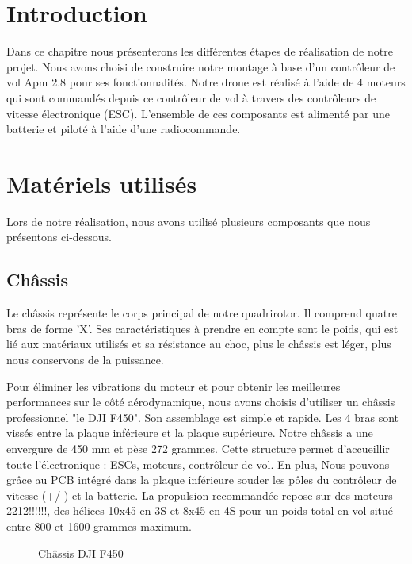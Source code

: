 \documentclass[a4paper,12pt]{book}
\begin{document}
	\section{Introduction}
	
	Dans ce chapitre nous présenterons les différentes étapes de réalisation de notre projet. Nous avons choisi de construire notre montage à base d’un contrôleur de vol Apm 2.8 pour ses fonctionnalités. Notre drone est réalisé à l’aide de 4 moteurs qui sont commandés depuis ce contrôleur de vol  à travers des contrôleurs de vitesse électronique (ESC). L'ensemble de ces composants  est alimenté par une batterie et piloté à l’aide d’une radiocommande.
	\section{Matériels utilisés}
	Lors de notre réalisation, nous avons utilisé plusieurs composants que nous présentons ci-dessous.
	\subsection{Châssis}
Le châssis représente le corps principal de notre quadrirotor. Il comprend quatre bras de forme ’X’. Ses caractéristiques à prendre en compte sont le poids, qui est lié aux matériaux utilisés et sa résistance au choc, plus le châssis est léger, plus nous conservons de la puissance.

Pour éliminer les vibrations du moteur et pour obtenir les meilleures performances sur le côté aérodynamique, nous avons choisis d’utiliser un châssis professionnel "le DJI F450". Son assemblage est simple et rapide. Les 4 bras sont vissés entre la plaque inférieure et la plaque supérieure. Notre châssis a une envergure de 450 mm et pèse 272 grammes.
Cette structure permet d’accueillir toute l’électronique : ESCs, moteurs, contrôleur de vol. En plus, Nous pouvons grâce au PCB intégré dans la plaque inférieure souder les pôles  du contrôleur de vitesse (+/-) et la batterie. La propulsion recommandée repose sur des moteurs 2212!!!!!!, des hélices 10x45 en 3S et 8x45 en 4S pour un poids total en vol situé entre 800 et 1600 grammes maximum.

	\begin{figure} [h]
		\begin{center}
			\centering
		\end{center}
		\caption{Châssis DJI F450}
	\end{figure}
\newpage
\end{document}
